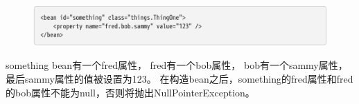 \begin{figure}[ht]
    \centering
    \includegraphics[width=1\linewidth]{./Figure/IMG_code_54.png}
\end{figure}

something bean有一个fred属性，
fred有一个bob属性，
bob有一个sammy属性，最后sammy属性的值被设置为123。
在构造bean之后，something的fred属性和fred的bob属性不能为null，否则将抛出NullPointerException。







